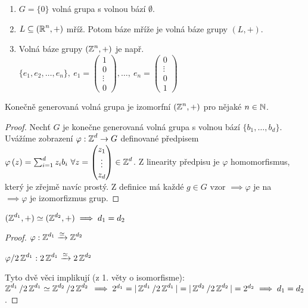 \begin{note}\phantom{}

\begin{enumerate}
    \item $G = \{0\}$ volná grupa s volnou bází $\emptyset$.
    \item $L \subseteq (\operatorname{\mathbb{R}}^n, +)$ mříž. Potom báze mříže je volná báze grupy $(L,+)$.
    \item Volná báze grupy $(\operatorname{\mathbb{Z}}^n, +)$ je např. $\{e_1, e_2, \dots , e_n\}, \ e_1 = \begin{pmatrix}
1 \\
0 \\
\vdots \\
0
\end{pmatrix}, \dots, \
e_n=\begin{pmatrix}
0 \\
\vdots \\
0 \\
1
\end{pmatrix}$
\end{enumerate}
\end{note}


\begin{claim}
Konečně generovaná volná grupa je izomorfní $(\operatorname{\mathbb{Z}}^n,+)$ pro nějaké $n\in\operatorname{\mathbb{N}}$.
\end{claim}
\begin{proof}
Nechť $G$ je konečne generovaná volná grupa s volnou bází $\{b_1,\ldots,b_d\}$. Uvážíme zobrazení $\varphi:\operatorname{\mathbb{Z}}^d\rightarrow G$ definované předpisem $\varphi \left( z \right) = \sum_{i=1}^d z_i b_i \ \forall z = \begin{pmatrix}
z_1 \\
\vdots \\
z_d \\
\end{pmatrix} \in \operatorname{\mathbb{Z}}^d$.
Z linearity předpisu je $\varphi$ homomorfismus, který je zřejmě navíc prostý.
Z definice má každé $g \in G$ vzor $\implies \varphi$ je na \\$\implies \varphi$ je izomorfizmus grup.
\end{proof}


\begin{claim}
$(\operatorname{\mathbb{Z}}^{d_1}, +) \simeq (\operatorname{\mathbb{Z}}^{d_2}, +) \implies d_1 = d_2$
\end{claim}

\begin{proof}
$\varphi: \operatorname{\mathbb{Z}}^{d_1} \xrightarrow{\simeq} \operatorname{\mathbb{Z}}^{d_2} $

$\varphi/2\operatorname{\mathbb{Z}}^{d_1}: 2\operatorname{\mathbb{Z}}^{d_1} \xrightarrow{\simeq} 2\operatorname{\mathbb{Z}}^{d_2}$

Tyto dvě věci implikují (z 1. věty o isomorfisme): $\operatorname{\mathbb{Z}}^{d_1}/2\operatorname{\mathbb{Z}}^{d_1}\simeq \operatorname{\mathbb{Z}}^{d_2}/2\operatorname{\mathbb{Z}}^{d_2} \\ \implies 2^{d_1} = |\operatorname{\mathbb{Z}}^{d_1}/2\operatorname{\mathbb{Z}}^{d_1}| = |\operatorname{\mathbb{Z}}^{d_2}/2\operatorname{\mathbb{Z}}^{d_2}| = 2^{d_2} \implies d_1=d_2$.
\end{proof}


